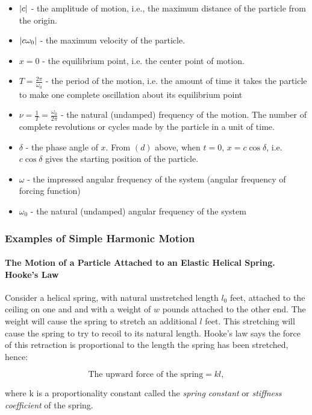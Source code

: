 \documentclass{article}
\begin{document}
\begin{itemize}
\item $\left| c \right|$ - the amplitude of motion, i.e., the maximum distance of the particle from the origin.
\item $\left| c \omega_0 \right|$ - the maximum velocity of the particle.
\item $x = 0$ - the equilibrium point, i.e. the center point of motion.
\item $T = \frac{2 \pi}{\omega_0}$ - the period of the motion, i.e. the amount of time it takes the particle to make one complete oscillation about its equilibrium point
\item $\nu = \frac{1}{T} = \frac{\omega_0}{2 \pi}$ - the natural (undamped) frequency of the motion. The number of complete revolutions or cycles made by the particle in a unit of time.
\item $\delta$ - the phase angle of $x$. From $(d)$ above, when $t = 0$, $x = c \cos{\delta}$, i.e. $c \cos{\delta}$ gives the starting position of the particle.
\item $\omega$ - the impressed angular frequency of the system (angular frequency of forcing function)
\item $\omega_0$ - the natural (undamped) angular frequency of the system
\end{itemize}

\subsubsection{Examples of Simple Harmonic Motion}

\paragraph{The Motion of a Particle Attached to an Elastic Helical Spring. Hooke's Law}

Consider a helical spring, with natural unstretched length $l_0$ feet, attached to the ceiling on one and and with a weight of $w$ pounds attached to the other end. The weight will cause the spring to stretch an additional $l$ feet. This stretching will cause the spring to try to recoil to its natural length. Hooke's law says the force of this retraction is proportional to the length the spring has been stretched, hence:

\[ \tag{26.81} \text{The upward force of the spring} = kl, \]

where k is a proportionality constant called the \emph{spring constant} or \emph{stiffness coefficient} of the spring.
\end{document}
